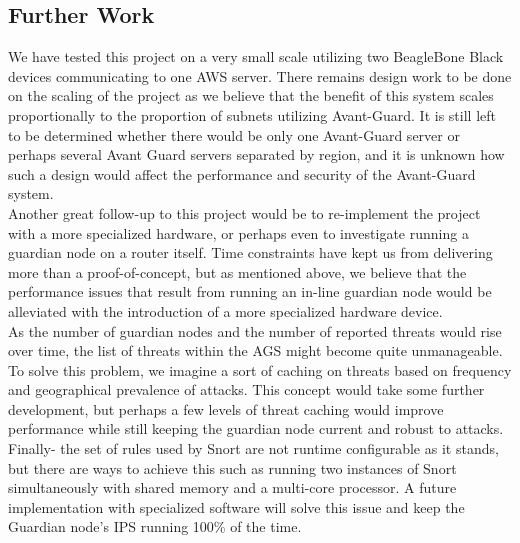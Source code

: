 \subsection{Further Work}
\label{sec:concl:further}
We have tested this project on a very small scale utilizing two BeagleBone Black devices communicating to one AWS server. There remains design work to be done on the scaling of the project as we believe that the benefit of this system scales proportionally to the proportion of subnets utilizing Avant-Guard. It is still left to be determined whether there would be only one Avant-Guard server or perhaps several Avant Guard servers separated by region, and it is unknown how such a design would affect the performance and security of the Avant-Guard system. \\

Another great follow-up to this project would be to re-implement the project with a more specialized hardware, or perhaps even to investigate running a guardian node on a router itself. Time constraints have kept us from delivering more than a proof-of-concept, but as mentioned above, we believe that the performance issues that result from running an in-line guardian node would be alleviated with the introduction of a more specialized hardware device. \\

As the number of guardian nodes and the number of reported threats would rise over time, the list of threats within the AGS might become quite unmanageable. To solve this problem, we imagine a sort of caching on threats based on frequency and geographical prevalence of attacks. This concept would take some further development, but perhaps a few levels of threat caching would improve performance while still keeping the guardian node current and robust to attacks. \\

Finally- the set of rules used by Snort are not runtime configurable as it stands, but there are ways to achieve this such as running two instances of Snort simultaneously with shared memory and a multi-core processor. A future implementation with specialized software will solve this issue and keep the Guardian node's IPS running 100\% of the time.